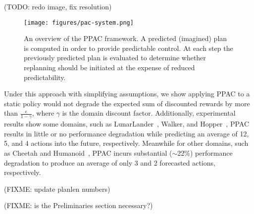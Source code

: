 \documentclass{article}
\begin{document}
        (TODO: redo image, fix resolution)
        
        \begin{figure}
            \texttt{[image: figures/pac-system.png]}
            \caption{An overview of the PPAC framework. A predicted (imagined) plan is computed in order to provide predictable control. At each step the previously predicted plan is evaluated to determine whether replanning should be initiated at the expense of reduced predictability.}
            \label{pac-system}
        \end{figure}
        
        Under this approach with simplifying assumptions, we show applying PPAC to a static policy would not degrade the expected sum of discounted rewards by more than $\frac{\epsilon}{1-\gamma}$, where $\gamma$ is the domain discount factor. Additionally, experimental results show some domains, such as LunarLander~\cite{gym}, Walker, and Hopper~\cite{pybullet}, PPAC results in little or no performance degradation while predicting an average of 12, 5, and 4 actions into the future, respectively. Meanwhile for other domains, such as Cheetah and Humanoid~\cite{pybullet}, PPAC incurs substantial ($\sim$22\%) performance degradation to produce an average of only 3 and 2 forecasted actions, respectively.
        
        (FIXME: update planlen numbers)
        
        (FIXME: is the Preliminaries section necessary?)
\end{document}
